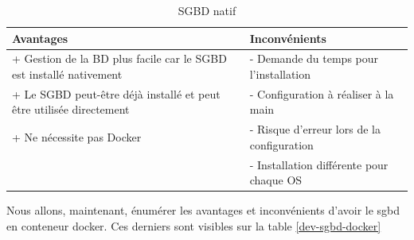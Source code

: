 \documentclass[
    iai, %
    il, %
]{heig-tb}
\begin{document}
\begin{table}[h]
    \begin{center}
        \caption{SGBD natif \label{dev-sgbd-native}}
        \begin{tabularx}{1.0\textwidth} {X|X}
            Avantages                                                           & Inconvénients \\ \hline
            + Gestion de la BD plus facile car le SGBD est installé nativement  &
            - Demande du temps pour l'installation                                              \\
            + Le SGBD peut-être déjà installé et peut être utilisée directement &
            - Configuration à réaliser à la main                                                \\
            + Ne nécessite pas Docker                                           &
            - Risque d'erreur lors de la configuration                                          \\             & - Installation différente pour chaque OS                                                                    \\
        \end{tabularx}
    \end{center}
\end{table}

Nous allons, maintenant, énumérer les avantages et inconvénients d'avoir le \Gls{sgbd} en \Gls{conteneur}
\Gls{docker}. Ces derniers sont visibles sur la table \ref{dev-sgbd-docker}
\end{document}
